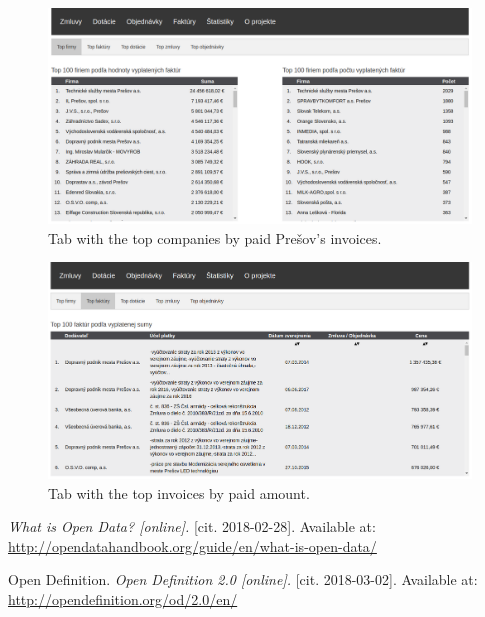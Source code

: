 \documentclass[thesis=B,english]{FITthesis}[2012/06/26]
\begin{document}
{\begin{figure}[H]
  \begin{center}
  \includegraphics[scale=0.30]{pictures/statistics.png}
  \caption{Tab with the top companies by paid Prešov's invoices.}
    \label{fig:webapp-topcompanies}
  \end{center}
\end{figure}

\begin{figure}[H]
  \begin{center}
  \includegraphics[scale=0.30]{pictures/topInvoices.png}
  \caption{Tab with the top invoices by paid amount.}
    \label{fig:webapp-topinvoices}
  \end{center}
\end{figure}


\begin{thebibliography}{9}
\textit{What is Open Data? [online].}
[cit. 2018-02-28]. Available at: \url{http://opendatahandbook.org/guide/en/what-is-open-data/} 

Open Definition.
\textit{Open Definition 2.0 [online].}
[cit. 2018-03-02]. Available at: \url{http://opendefinition.org/od/2.0/en/} 


\end{thebibliography}}
\end{document}
